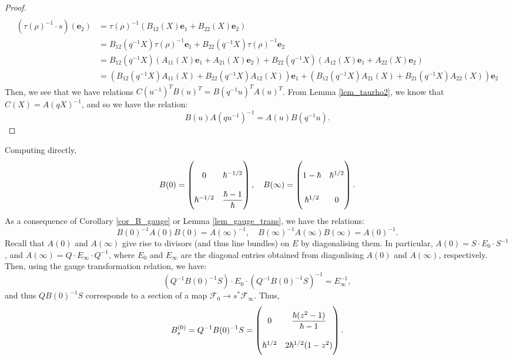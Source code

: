 \documentclass[a4paper]{report}
\theoremstyle{theorem}
\theoremstyle{definition}
\theoremstyle{remark}
\theoremstyle{proposition}
\theoremstyle{conjecture}
\theoremstyle{lemma}
\theoremstyle{corollary}
\theoremstyle{exercise}
\theoremstyle{example}
\newcommand{\mcal}{\mathcal}
\begin{document}
\begin{proof}
\begin{align*}
      \end{align*}
      \begin{align*}
          (\tau(\rho)^{-1} \cdot s) (\mathbf{e}_2) &= \tau(\rho)^{-1} (B_{12}(X) \mathbf{e}_1 + B_{22}(X) \mathbf{e}_2)\\
          &= B_{12}(q^{-1}X) \tau(\rho)^{-1} \mathbf{e}_1 + B_{22}(q^{-1}X) \tau(\rho)^{-1} \mathbf{e}_2\\ 
          &= B_{12}(q^{-1}X) \left(A_{11}(X) \mathbf{e}_1 + A_{21}(X) \mathbf{e}_2\right) + B_{22}(q^{-1}X) \left(A_{12}(X) \mathbf{e}_1 + A_{22}(X) \mathbf{e}_2\right)\\ 
          &= \left(B_{12}(q^{-1}X) A_{11}(X) + B_{22}(q^{-1}X) A_{12}(X)\right)\mathbf{e}_1 + \left(B_{12}(q^{-1}X) A_{21}(X) + B_{21}(q^{-1}X) A_{22}(X)\right)\mathbf{e}_2
      \end{align*}
      Then, we see that we have relations 
      $C(u^{-1})^T B(u)^T = B(q^{-1}u)^T A(u)^T$. From Lemma \ref{lem_taurho2}, we know that 
      $C(X) = A(qX)^{-1}$, and so we have the relation:
      $$B(u) A(qu^{-1})^{-1} = A(u) B(q^{-1}u).$$
  \end{proof}
  Computing directly,
  $$B(0) = \renewcommand\arraystretch{2.5}\begin{pmatrix}
      0 & \hbar^{-1/2}\\
      \hbar^{-1/2} & \displaystyle\frac{\hbar - 1}{\hbar} 
  \end{pmatrix}, \quad B(\infty) = \renewcommand\arraystretch{2.5}\begin{pmatrix}
      1 - \hbar & \hbar^{1/2}\\ 
      \hbar^{1/2} & 0
  \end{pmatrix}.$$
  As a consequence of Corollary \ref{cor_B_gauge} or Lemma \ref{lem_gauge_trans},
  we have the relations:
  $$B(0)^{-1} A(0) B(0) = A(\infty)^{-1}, \quad B(\infty)^{-1} A(\infty) B(\infty) = A(0)^{-1}.$$
  Recall that $A(0)$ and $A(\infty)$ give rise to divisors (and thus line bundles) on $E$ 
  by diagonalising them. In particular, $A(0) = S\cdot  E_0 \cdot S^{-1}$, and $A(\infty) = Q\cdot  E_\infty \cdot Q^{-1}$,
  where $E_0$ and $E_\infty$ are the diagonal entries obtained from diagonlising $A(0)$ and 
  $A(\infty)$, respectively. Then, using the gauge transformation relation, we have:
  $$\left(Q^{-1}B(0)^{-1}S\right) \cdot E_0 \cdot \left(Q^{-1}B(0)^{-1}S\right)^{-1} = E_\infty^{-1},$$
  and thus $QB(0)^{-1} S$ corresponds to a section of a map $\mcal{F}_0 \to s^\ast \mcal{F}_\infty$. Thus, 
  \begin{equation}\label{eqn_Bs0}
      B_s^{(0)} = Q^{-1} B(0)^{-1} S = \renewcommand\arraystretch{2.5}\begin{pmatrix}
          0 & \displaystyle\frac{\hbar(z^2-1)}{\hbar - 1}\\ 
          \hbar^{1/2} & 2\hbar^{1/2}(1-z^2)
  \end{pmatrix}.
  \end{equation}
\end{document}
